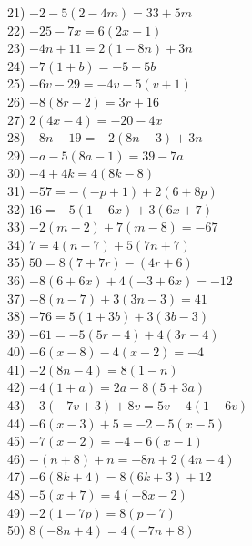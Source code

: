 \documentclass[12pt]{book}
\theoremstyle{definition}
\begin{document}
	\begin{multicols}{2}
  21) $- 2 - 5 (2 - 4 m) = 33 + 5 m$\\
  22) $- 25 - 7 x = 6 (2 x - 1)$\\
  23) $- 4 n + 11 = 2 (1 - 8 n) + 3 n$\\
  24) $- 7 (1 + b) = - 5 - 5 b$\\
  25) $- 6 v - 29 = - 4 v - 5 (v + 1) $\\
  26) $- 8 (8 r - 2) = 3 r + 16$\\
  27) $2 (4 x - 4) = - 20 - 4 x$\\
  28) $- 8 n - 19 = - 2 (8 n - 3) + 3 n$\\
  29) $- a - 5 (8 a - 1) = 39 - 7 a$\\
  30) $- 4 + 4 k = 4 (8 k - 8)$\\
  31) $- 57 = - (- p + 1) + 2 (6 + 8 p)$\\
  32) $16 = - 5 (1 - 6 x) + 3 (6 x + 7)$\\
  33) $- 2 (m - 2) + 7 (m - 8) = - 67$\\
  34) $7 = 4 (n - 7) + 5 (7 n + 7)$\\
  35) $50 = 8 (7 + 7 r) - (4 r + 6)$\\
  36) $- 8 (6 + 6 x) + 4 (- 3 + 6 x) = - 12$\\
  37) $- 8 (n - 7) + 3 (3 n - 3) = 41$\\
  38) $- 76 = 5 (1 + 3 b) + 3 (3 b - 3)$\\
  39) $- 61 = - 5 (5 r - 4) + 4 (3 r - 4)$\\
  40) $- 6 (x - 8) - 4 (x - 2) = - 4$\\
  41) $- 2 (8 n - 4) = 8 (1 - n)$\\
  42) $- 4 (1 + a) = 2 a - 8 (5 + 3 a) $\\
  43) $- 3 (- 7 v + 3) + 8 v = 5 v - 4 (1 - 6 v) $\\
  44) $- 6 (x - 3) + 5 = - 2 - 5 (x - 5)$\\
  45) $- 7 (x - 2) = - 4 - 6 (x - 1)$\\
  46) $- (n + 8) + n = - 8 n + 2 (4 n - 4)$\\
  47) $- 6 (8 k + 4) =  8 (6 k + 3) + 12$\\
  48) $- 5 (x + 7) = 4 (- 8 x - 2)$\\
  49) $- 2 (1 - 7 p) = 8 (p - 7)$\\
  50) $8 (- 8 n + 4) = 4 (- 7 n + 8)$
\end{multicols}
\end{document}
